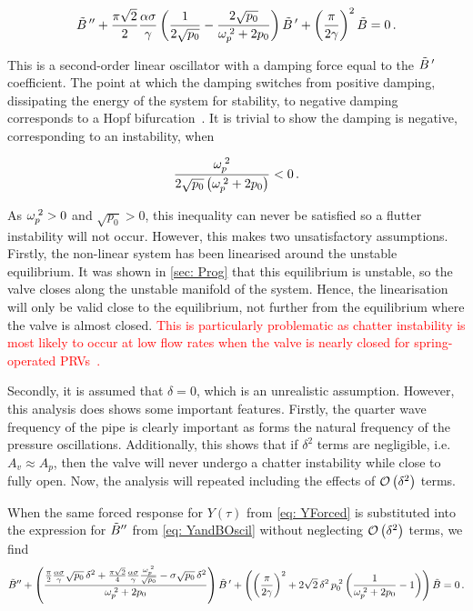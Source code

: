 \begin{equation*}
    \tilde{B}\,{''} + \frac{\pi \sqrt{2}}{2} \frac{\alpha \sigma}{\gamma} \left( \frac{1}{2 \sqrt{p_0}} - \frac{2 \sqrt{p_0}}{\omega_p^{\;2}+2 p_0} \right) \tilde{B}\,{'} + \left( \frac{\pi}{2 \gamma} \right)^2 \tilde{B} = 0 \, .
\end{equation*}

This is a second-order linear oscillator with a damping force equal to the $\tilde{B}\,{'}$ coefficient. The point at which the damping switches from positive damping, dissipating the energy of the system for stability, to negative damping corresponds to a Hopf bifurcation~\cite{Kuznetsov2004ElementsTheory}. It is trivial to show the damping is negative, corresponding to an instability, when

\begin{equation*}
    \frac{\omega_p^{\;2}}{2 \sqrt{p_0} \left( \omega_p^{\;2} + 2 p_0 \right)} < 0 \, .
\end{equation*}

As $\omega_p^{\;2} > 0$ and $\sqrt{p_0} > 0$, this inequality can never be satisfied so a flutter instability will not occur. However, this makes two unsatisfactory assumptions. Firstly, the non-linear system has been linearised around the unstable equilibrium. It was shown in \cref{sec: Prog} that this equilibrium is unstable, so the valve closes along the unstable manifold of the system. Hence, the linearisation will only be valid close to the equilibrium, not further from the equilibrium where the valve is almost closed. \textcolor{Red}{This is particularly problematic as chatter instability is most likely to occur at low flow rates when the valve is nearly closed for spring-operated PRVs~\cite{Hos2016DynamicService}.}

Secondly, it is assumed that $\delta = 0$, which is an unrealistic assumption. However, this analysis does shows some important features. Firstly, the quarter wave frequency of the pipe is clearly important as forms the natural frequency of the pressure oscillations. Additionally, this shows that if $\delta^2$ terms are negligible, i.e. $A_v \approx A_p$, then the valve will never undergo a chatter instability while close to fully open. Now, the analysis will repeated including the effects of $\mathcal{O}\left( \delta^2 \right)$ terms.

When the same forced response for $Y(\tau)$ from \cref{eq: YForced} is substituted into the expression for $\tilde{B}{''}$ from \cref{eq: YandBOscil} without neglecting $\mathcal{O}\left( \delta^2 \right)$ terms, we find
~
\begin{equation*}
    \tilde{B}{''} +
    \left( \frac{
    \frac{\pi}{2} \frac{\alpha \sigma}{\gamma} \sqrt{p_0} \, \delta^2 + \frac{\pi \sqrt{2}}{4} \frac{\alpha \sigma}{\gamma} \frac{\omega_p^{\;2}}{\sqrt{p_0}} - \sigma \sqrt{p_0} \, \delta^2
    }{\omega_p^{\;2} + 2 p_0} \right) \tilde{B}\,{'} +
    \left( \left( \frac{\pi}{2 \gamma} \right)^2 + 2 \sqrt{2} \, \delta^2 \, p_0^{\;2} \left( \frac{1}{\omega_p^{\;2} + 2 p_0} - 1 \right) \right) \tilde{B} = 0 \, .
\end{equation*}

